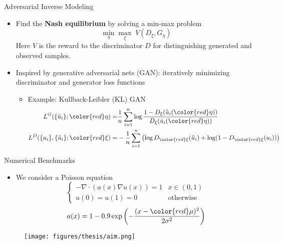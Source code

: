 \documentclass[usenames,dvipsnames]{beamer}
\begin{document}
\begin{frame}{Adversarial Inverse Modeling}
	\begin{itemize}
\item Find the \textbf{Nash equilibrium} by solving a min-max problem 
$$\min_\eta \max_\xi\; V(D_\xi, G_\eta)$$
Here $V$ is the reward to the discriminator $D$ for distinguishing  generated and observed samples.
\item Inspired by generative adversarial nets (GAN): iteratively minimizing discriminator and generator loss functions
\begin{itemize}
\item Example: Kullback-Leibler (KL) GAN
\begin{equation*}
	\begin{aligned}
		L^G(\{\hat u_i\}; {\color{red}\eta}) =&  \frac{1}{n}\sum_{i=1}^n \log\frac{ 1-D_{\xi}(\hat  u_i({\color{red}\eta}))}{D_{\xi}(\hat  u_i({\color{red}\eta}))} \\
		L^D(\{ u_i\}, \{\hat u_i\}; {\color{red}\xi}) =& -\frac{1}{n}\sum_{i=1}^n \left( \log D_{\color{red}\xi}(\hat  u_i) + \log(1-D_{\color{red}\xi}( u_i)) \right)
	\end{aligned} 
\end{equation*}
\end{itemize}  
	\end{itemize}

\end{frame}


\begin{frame}{Numerical Benchmarks}

\begin{itemize}
\item We consider a Poisson equation 
$$\begin{cases}
	-\nabla \cdot (a(x)\nabla u(x)) = 1 & x\in(0,1)\\
	u(0) = u(1) = 0 & \mbox{otherwise}
\end{cases}$$
$$a(x) = 1-0.9\exp\left( -\frac{(x-{\color{red}\mu})^2}{2{\sigma}^2} \right)$$
\end{itemize}
	\begin{figure}[htbp]
	\centering
	\texttt{[image: figures/thesis/aim.png]}
\end{figure}
\end{frame}
\end{document}
